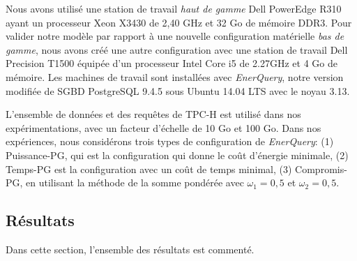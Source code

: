 Nous avons utilisé une station de travail \textit{haut de gamme} Dell PowerEdge R310 ayant un processeur Xeon X3430 de 2,40 GHz et 32 Go de mémoire DDR3. Pour valider notre modèle par rapport à une nouvelle configuration matérielle \textit{bas de gamme}, nous avons créé une autre configuration avec une station de travail Dell Precision T1500 équipée d'un processeur Intel Core i5 de 2.27GHz et 4 Go de mémoire.
Les machines de travail sont installées avec \textit{EnerQuery}, notre version modifiée de SGBD PostgreSQL 9.4.5 sous Ubuntu 14.04 LTS avec le noyau 3.13.

L'ensemble de données et des requêtes de TPC-H est utilisé dans nos expérimentations, avec un facteur d'échelle de 10 Go et 100 Go. Dans nos expériences, nous considérons trois types de configuration de \textit{EnerQuery}: (1) Puissance-PG, qui est la configuration qui donne le coût d'énergie minimale, (2) Temps-PG est la configuration avec un coût de temps minimal, (3) Compromis-PG, en utilisant la méthode de la somme pondérée avec $\omega_1 = 0,5$ et $\omega_2 = 0,5$.

\subsection{Résultats}\label{subsec:ResultsPostgres}
Dans cette section, l'ensemble des résultats est commenté.

